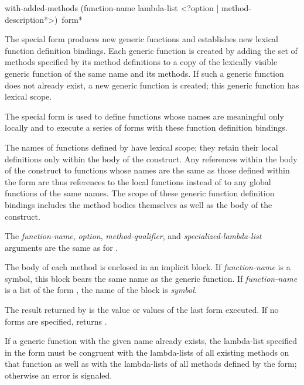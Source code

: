 \begin{defspec}
with-added-methods (function-name lambda-list
      <?option | {method-description}*>)
      {\,form}*

\relax
{}
\noindent
The  special form
produces new generic functions and establishes new
lexical function definition bindings.  Each generic function is created by
adding the set of methods specified by its method definitions to a copy of the
lexically visible generic function of the same name and its methods.  If
such a generic function does not already exist, a new generic function is
created; this generic function has lexical scope.

The special form  is used to define functions
whose names are meaningful only locally and to execute a series of
forms with these function definition bindings.


The names of functions defined by  have lexical
scope; they retain their local definitions only within the body of the
 construct.  Any references within the body of the
 construct to functions whose names are the same
as those defined within the  form are thus
references to the local functions instead of to any global functions
of the same names.  The scope of these generic function definition bindings
includes the method bodies themselves as well as the body of the 
 construct.





The {\it function-name}, {\it option}, {\it method-qualifier}, and {\it
specialized-lambda-list\/} arguments are the same as for .

The body of each method is enclosed in an implicit block.  If
{\it function-name\/} is a symbol, this block bears the same name as the
generic function.  If {\it function-name\/} is a list of the form 
, the name of the block is {\it symbol}.  


The result returned by  is the value or values
of the last form executed.  If no forms are specified, 
 returns .


If a generic function with the given name already exists, the
lambda-list specified in the  form must be
congruent with the lambda-lists of all existing methods on that
function as well as with the lambda-lists of all methods defined by the
 form; otherwise an error is signaled.


\end{defspec}
